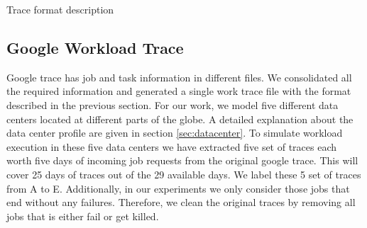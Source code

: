 \documentclass[letterpaper,twocolumn,10pt]{article}
\begin{document}
\begin {table}[]
\centering
    \caption {Trace format description} \label{tab:format} 
\end{table}

\subsection{Google Workload Trace} \label{googletrace}
Google trace has job and task information in different files. We consolidated all the required information and generated a single work trace file with the format described in the previous section. For our work, we model five different data centers located at different parts of the globe. A detailed explanation about the data center profile are given in section \ref{sec:datacenter}. To simulate workload execution in these five data centers we have extracted five set of traces each worth five days of incoming job requests from the original google trace. This will cover 25 days of traces out of the 29 available days. We label these 5 set of traces from A to E. Additionally, in our experiments we only consider those jobs that end without any failures. Therefore, we clean the original traces by removing all jobs that is either fail or get killed. 
\end{document}
